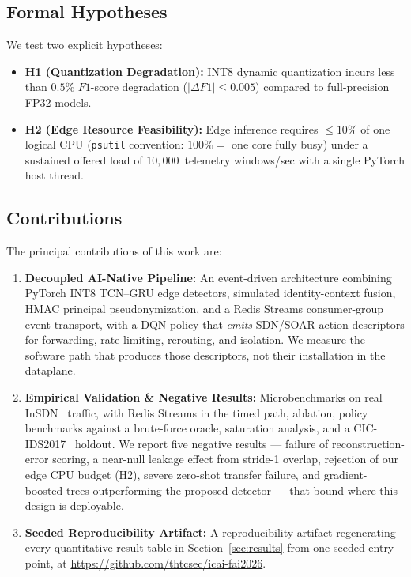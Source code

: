 \documentclass[conference,a4paper]{IEEEtran}
\begin{document}
\subsection{Formal Hypotheses}
We test two explicit hypotheses:
\begin{itemize}
    \item \textbf{H1 (Quantization Degradation):} INT8 dynamic quantization incurs less than $0.5\%$ $F1$-score degradation ($|\Delta F1| \le 0.005$) compared to full-precision FP32 models.
    \item \textbf{H2 (Edge Resource Feasibility):} Edge inference requires $\le 10\%$ of one logical CPU (\texttt{psutil} convention: $100\% =$ one core fully busy) under a sustained offered load of $10{,}000$~telemetry windows/sec with a single PyTorch host thread.
\end{itemize}

\subsection{Contributions}
The principal contributions of this work are:
\begin{enumerate}
    \item \textbf{Decoupled AI-Native Pipeline:} An event-driven architecture combining PyTorch INT8 TCN--GRU edge detectors, simulated identity-context fusion, HMAC principal pseudonymization, and a Redis Streams consumer-group event transport, with a DQN policy that \emph{emits} SDN/SOAR action descriptors for forwarding, rate limiting, rerouting, and isolation. We measure the software path that produces those descriptors, not their installation in the dataplane.
    \item \textbf{Empirical Validation \& Negative Results:} Microbenchmarks on real InSDN~\cite{b1} traffic, with Redis Streams in the timed path, ablation, policy benchmarks against a brute-force oracle, saturation analysis, and a CIC-IDS2017~\cite{b2} holdout. We report five negative results --- failure of reconstruction-error scoring, a near-null leakage effect from stride-1 overlap, rejection of our edge CPU budget (H2), severe zero-shot transfer failure, and gradient-boosted trees outperforming the proposed detector --- that bound where this design is deployable.
    \item \textbf{Seeded Reproducibility Artifact:} A reproducibility artifact regenerating every quantitative result table in Section~\ref{sec:results} from one seeded entry point, at \url{https://github.com/thtcsec/icai-fai2026}.
\end{enumerate}
\end{document}
